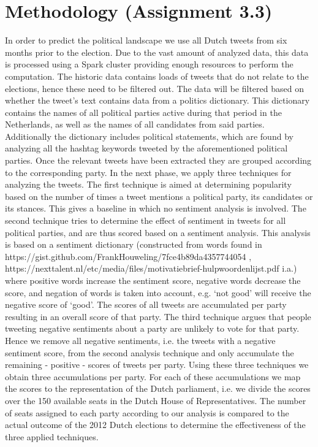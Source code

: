 \documentclass[a4paper]{report}
\begin{document}
\section*{Methodology (Assignment 3.3)}
In order to predict the political landscape we use all Dutch tweets from six months prior to the election. Due to the vast amount of analyzed data, this data is processed using a Spark cluster providing enough resources to perform the computation. The historic data contains loads of tweets that do not relate to the elections, hence these need to be filtered out. The data will be filtered based on whether the tweet’s text contains data from a politics dictionary. This dictionary contains the names of all political parties active during that period in the Netherlands, as well as the names of all candidates from said parties. Additionally the dictionary includes political statements, which are found by analyzing all the hashtag keywords tweeted by the aforementioned political parties. Once the relevant tweets have been extracted they are grouped according to the corresponding party. In the next phase, we apply three techniques for analyzing the tweets. The first technique is aimed at determining popularity based on the number of times a tweet mentions a political party, its candidates or its stances. This gives a baseline in which no sentiment analysis is involved. The second technique tries to determine the effect of sentiment in tweets for all political parties, and are thus scored based on a sentiment analysis. This analysis is based on a sentiment dictionary (constructed from words found in https://gist.github.com/FrankHouweling/7fce4b89da4357744054 ,\\ https://nexttalent.nl/etc/media/files/motivatiebrief-hulpwoordenlijst.pdf i.a.) \\
where positive words increase the sentiment score, negative words decrease the score, and negation of words is taken into account, e.g. ‘not good’ will receive the negative score of ‘good’. The scores of all tweets are accumulated per party resulting in an overall score of that party. The third technique argues that people tweeting negative sentiments about a party are unlikely to vote for that party. Hence we remove all negative sentiments, i.e. the tweets with a negative sentiment score, from the second analysis technique and only accumulate the remaining - positive - scores of tweets per party. Using these three techniques we obtain three accumulations per party. For each of these accumulations we map the scores to the representation of the Dutch parliament, i.e. we divide the scores over the 150 available seats in the Dutch House of Representatives. The number of seats assigned to each party according to our analysis is compared to the actual outcome of the 2012 Dutch elections to determine the effectiveness of the three applied techniques.
\end{document}
